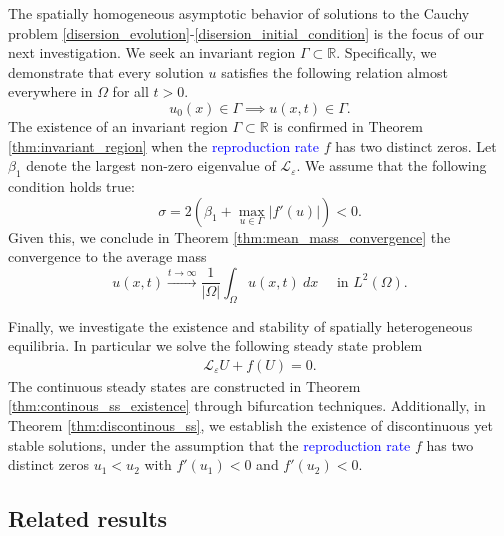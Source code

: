 \documentclass[12pt, a4paper]{article}
\theoremstyle{break}
\theoremstyle{break}
\theoremstyle{break}
\theoremstyle{break}
\theoremstyle{break}
\newcommand{\Leo}{\mathcal{L}_{\varepsilon}}
\begin{document}
\hspace{1pt}

The spatially homogeneous asymptotic behavior of solutions to the Cauchy problem \eqref{disersion_evolution}-\eqref{disersion_initial_condition} is the focus of our next investigation. We seek an invariant region $\Gamma \subset \mathbb{R}$. Specifically, we demonstrate that every solution $u$ satisfies the following relation almost everywhere in $\Omega$ for all $t > 0$.
\begin{equation}
    u_0(x) \in \Gamma \implies u(x, t) \in \Gamma.
    \label{invariant_region_definiton}
\end{equation}
The existence of an invariant region $\Gamma \subset \mathbb{R}$ is confirmed in Theorem \ref{thm:invariant_region} when the \textcolor{blue}{reproduction rate} $f$ has two distinct zeros. Let $\beta_1$ denote the largest non-zero eigenvalue of $\Leo$. We assume that the following condition holds true:
\begin{equation}
    \sigma = 2\left(\beta_1 + \max_{u \in \Gamma} |f'(u)|\right) < 0.
\end{equation}
Given this, we conclude in Theorem \ref{thm:mean_mass_convergence} the convergence to the average mass 
\begin{equation}
    u(x, t) \xrightarrow{t \rightarrow \infty} \frac{1}{|\Omega|} \int_\Omega u(x, t) \:dx \quad \text{ in $L^2(\Omega)$}.
    \label{convergence_to_mean_mass}
\end{equation}

\hspace{1pt}

Finally, we investigate the existence and stability of spatially heterogeneous equilibria. In particular we solve the following steady state problem 
\begin{align}
    \Leo U + f(U) = 0.
    \label{dispersal_equilibria}
\end{align}
The continuous steady states are constructed in Theorem \ref{thm:continous_ss_existence} through bifurcation techniques. Additionally, in Theorem \ref{thm:discontinous_ss}, we establish the existence of discontinuous yet stable solutions, under the assumption that the \textcolor{blue}{reproduction rate} $f$ has two distinct zeros $u_1 < u_2$ with $f'(u_1) < 0$ and $f'(u_2) < 0$.

\subsection{Related results}
\end{document}
